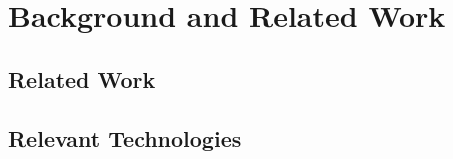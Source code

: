 ﻿\chapter{Background and Related Work}

\section{Related Work}
\label{sec:related_work}


\section{Relevant Technologies}
\label{sec:technologies}

